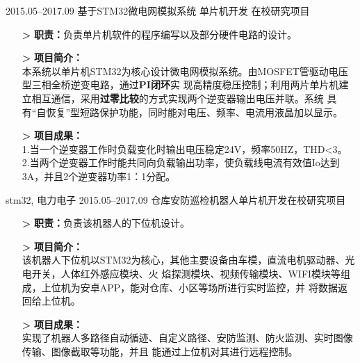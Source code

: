 %
%


 
\begin{experiences}
			
 \experience
    {2015.05--2017.09}   {基于STM32微电网模拟系统} {单片机开发} {在校研究项目}
    {}              {
                      \begin{itemize}
					    \item[\textbf{>}]  \textbf{职责：}负责单片机软件的程序编写以及部分硬件电路的设计。
                        \item[\textbf{>}] \textbf{项目简介：}\\
						本系统以单片机STM32为核心设计微电网模拟系统。由MOSFET管驱动电压型三相全桥逆变电路，通过\textbf{PI闭环}实
						现高精度稳压控制；利用两片单片机建立相互通信，采用\textbf{过零比较}的方式实现两个逆变器输出电压并联。系统
						具有“自恢复”型短路保护功能，同时能对电压、频率、电流用液晶加以显示。
                        \item[\textbf{>}] \textbf{项目成果：}\\
						1.当一个逆变器工作时负载变化时输出电压稳定24V，频率50HZ，THD<3。\\
						2.当两个逆变器工作时能共同向负载输出功率，使负载线电流有效值Io达到3A，并且2个逆变器功率1：1分配。\\
                                                                                              
                      \end{itemize}
                    }
                    {stm32, 电力电子}
  \emptySeparator
  \experience
    {2015.05--2017.09}  {仓库安防巡检机器人}{单片机开发}{在校研究项目}
    {}              {
                      \begin{itemize}
					    \item[\textbf{>}] \textbf{职责：}负责该机器人的下位机设计。
						\item[\textbf{>}] \textbf{项目简介：}\\
                        该机器人下位机以STM32为核心，其他主要设备由车模，直流电机驱动器、光电开关，人体红外感应模块、火
						焰探测模块、视频传输模块、WIFI模块等组成，上位机为安卓APP，能对仓库、小区等场所进行实时监控，并
						将数据返回给上位机。
                        \item[\textbf{>}] \textbf{项目成果：}\\
						实现了机器人多路径自动循迹、自定义路径、安防监测、防火监测、实时图像传输、图像截取等功能，并且
						能通过上位机对其进行远程控制。\\
                                                                                              

\end{itemize}}
\end{experiences}
